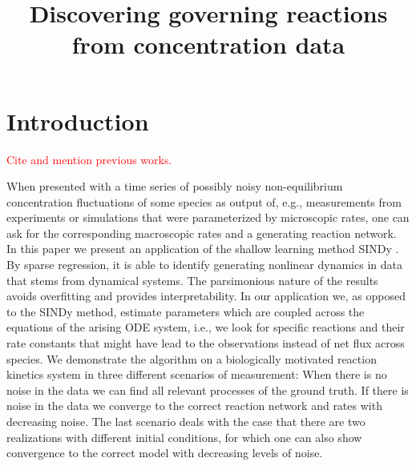 \documentclass[oneside, abstracton, titlepage]{scrartcl}
\begin{document}
	\title{Discovering governing reactions from concentration data}
	\maketitle

	\section{Introduction}
	\textcolor{red}{Cite and mention previous works.}
		
	When presented with a time series of possibly noisy non-equilibrium concentration fluctuations of some species as output of, e.g., measurements from experiments or simulations that were parameterized by microscopic rates, one can ask for the corresponding macroscopic rates and a generating reaction network.
	In this paper we present an application of the shallow learning method SINDy \cite{Brunton2015}. By sparse regression, it is able to identify generating nonlinear dynamics in data that stems from dynamical systems. The parsimonious nature of the results avoids overfitting and provides interpretability.
	In our application we, as opposed to the SINDy method, estimate parameters which are coupled across the equations of the arising ODE system, i.e., we look for specific reactions and their rate constants that might have lead to the observations instead of net flux across species.
	We demonstrate the algorithm on a biologically motivated reaction kinetics system in three different scenarios of measurement: When there is no noise in the data we can find all relevant processes of the ground truth. If there is noise in the data we converge to the correct reaction network and rates with decreasing noise. The last scenario deals with the case that there are two realizations with different initial conditions, for which one can also show convergence to the correct model with decreasing levels of noise.
\end{document}
